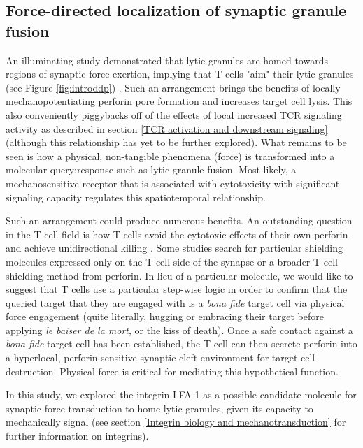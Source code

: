 \subsection{Force-directed localization of synaptic granule fusion}
\label{Force-directed localization of synaptic granule fusion}
An illuminating study demonstrated that lytic granules are homed towards regions of synaptic force exertion, implying that T cells "aim" their lytic granules (see Figure \ref{fig:introddp}) \cite{Basu2016}. Such an arrangement brings the benefits of locally mechanopotentiating perforin pore formation and increases target cell lysis. This also conveniently piggybacks off of the effects of local increased TCR signaling activity as described in section \ref{TCR activation and downstream signaling} (although this relationship has yet to be further explored). What remains to be seen is how a physical, non-tangible phenomena (force) is transformed into a molecular query:response such as lytic granule fusion. Most likely, a mechanosensitive receptor that is associated with cytotoxicity with significant signaling capacity regulates this spatiotemporal relationship. 

Such an arrangement could produce numerous benefits. An outstanding question in the T cell field is how T cells avoid the cytotoxic effects of their own perforin and achieve unidirectional killing \cite{Lopez2013}. Some studies search for particular shielding molecules expressed only on the T cell side of the synapse \cite{Balaji2002} or a broader T cell shielding method \cite{Rudd-schmidt} from perforin. In lieu of a particular molecule, we would like to suggest that T cells use a particular step-wise logic in order to confirm that the queried target that they are engaged with is a \textit{bona fide} target cell via physical force engagement (quite literally, hugging or embracing their target before applying \textit{le baiser de la mort}, or the kiss of death). Once a safe contact against a \textit{bona fide} target cell has been established, the T cell can then secrete perforin into a hyperlocal, perforin-sensitive synaptic cleft environment for target cell destruction. Physical force is critical for mediating this hypothetical function. 

In this study, we explored the integrin LFA-1 as a possible candidate molecule for synaptic force transduction to home lytic granules, given its capacity to mechanically signal (see section \ref{Integrin biology and mechanotransduction} for further information on integrins).


